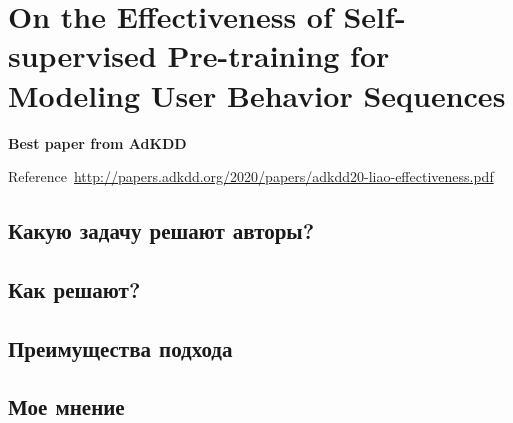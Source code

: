 \chapter{On the Effectiveness of Self-supervised Pre-training for Modeling User Behavior Sequences}

\textbf{Best paper from AdKDD}

Reference~\url{http://papers.adkdd.org/2020/papers/adkdd20-liao-effectiveness.pdf}

\section{Какую задачу решают авторы?}

\section{Как решают?}

\section{Преимущества подхода}

\section{Мое мнение}
